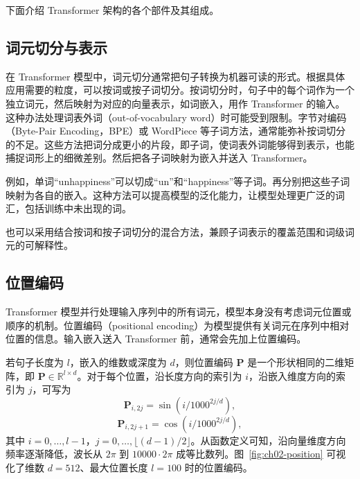 下面介绍 Transformer 架构的各个部件及其组成。

\subsection{词元切分与表示}
在 Transformer 模型中，词元切分通常把句子转换为机器可读的形式。根据具体应用需要的粒度，可以按词或按子词切分。按词切分时，句子中的每个词作为一个独立词元，然后映射为对应的向量表示，如词嵌入，用作 Transformer 的输入。这种办法处理词表外词（out-of-vocabulary word）时可能受到限制。字节对编码（Byte-Pair Encoding，BPE）或 WordPiece 等子词方法，通常能弥补按词切分的不足。这些方法把词分成更小的片段，即子词，使词表外词能够得到表示，也能捕捉词形上的细微差别。然后把各子词映射为嵌入并送入 Transformer。

例如，单词“unhappiness”可以切成“un”和“happiness”等子词。再分别把这些子词映射为各自的嵌入。这种方法可以提高模型的泛化能力，让模型处理更广泛的词汇，包括训练中未出现的词。

也可以采用结合按词和按子词切分的混合方法，兼顾子词表示的覆盖范围和词级词元的可解释性。

\subsection{位置编码}
Transformer 模型并行处理输入序列中的所有词元，模型本身没有考虑词元位置或顺序的机制。位置编码（positional encoding）为模型提供有关词元在序列中相对位置的信息。输入嵌入送入 Transformer 前，通常会先加上位置编码。

若句子长度为 $l$，嵌入的维数或深度为 $d$，则位置编码 $\symbf{P}$ 是一个形状相同的二维矩阵，即 $\symbf{P}\in\mathbb{R}^{l\times d}$。对于每个位置，沿长度方向的索引为 $i$，沿嵌入维度方向的索引为 $j$，可写为
\begin{equation}
\symbf{P}_{i,2j}=\sin(i/1000^{2j/d}),
\tag{2.13}
\end{equation}
\begin{equation}
\symbf{P}_{i,2j+1}=\cos(i/1000^{2j/d}),
\tag{2.14}
\end{equation}
其中 $i=0,\ldots,l-1$，$j=0,\ldots,\lfloor(d-1)/2\rfloor$。从函数定义可知，沿向量维度方向频率逐渐降低，波长从 $2\pi$ 到 $10000\cdot 2\pi$ 成等比数列。图~\ref{fig:ch02-position} 可视化了维数 $d=512$、最大位置长度 $l=100$ 时的位置编码。


